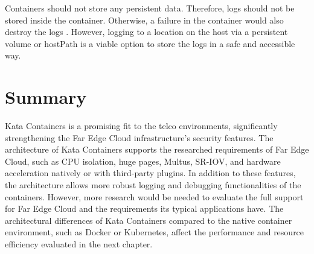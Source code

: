 Containers should not store any persistent data. Therefore, logs should not be stored inside the container. Otherwise, a failure in the container would also destroy the logs \cite{Toimela2017}. However, logging to a location on the host via a persistent volume or hostPath is a viable option to store the logs in a safe and accessible way. 

\section{Summary}

Kata Containers is a promising fit to the telco environments, significantly strengthening the Far Edge Cloud infrastructure's security features. The architecture of Kata Containers supports the researched requirements of Far Edge Cloud, such as CPU isolation, huge pages, Multus, SR-IOV, and hardware acceleration natively or with third-party plugins. In addition to these features, the architecture allows more robust logging and debugging functionalities of the containers. However, more research would be needed to evaluate the full support for Far Edge Cloud and the requirements its typical applications have. The architectural differences of Kata Containers compared to the native container environment, such as Docker or Kubernetes, affect the performance and resource efficiency evaluated in the next chapter.